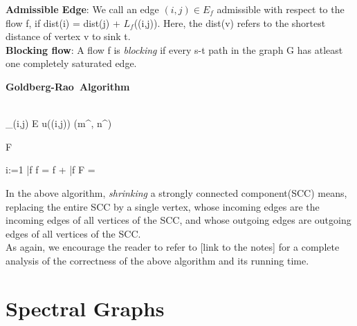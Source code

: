 \documentclass[BTech]{iitmdiss}
\begin{document}
	    
	    \textbf{Admissible Edge}: We call an edge $(i, j) \in E_f$ admissible with respect to the flow f, if dist(i) = dist(j) + $L_f$((i,j)). Here,
	    the dist(v) refers to the shortest distance of vertex v to sink t. \\
	    
	    \textbf{Blocking flow}: A flow f is \textit{blocking} if every s-t path in the graph G has atleast one completely saturated edge. \\
	    
	    \begin{program}
	      \mbox{\textbf{Goldberg-Rao Algorithm}}
	      
	      \BEGIN \\ %
		 \displaystyle\max_{(i,j) \in E} u((i,j))
		 \varLambda {} \min(m^{}, n^{})
		
		\WHILE F  \DO
		   \Delta {} 
		  
		  \FOR i:=1  \ast \varLambda \DO
		     
		     \bar{f}  
		    \text{ - }f = f + \bar{f}
		  \OD
		  F = 
		\OD
	      \END
	    \end{program}
	    
	    In the above algorithm, \textit{shrinking} a strongly connected component(SCC) means, replacing the entire SCC by a 
	    single vertex, whose incoming edges are the incoming edges of all vertices of the SCC, and whose outgoing edges
	    are outgoing edges of all vertices of the SCC. \\
	    
	    As again, we encourage the reader to refer to [link to the notes] for a complete analysis of the correctness of the above algorithm
	    and its running time.
	 \chapter{Spectral Graphs}
	 
\end{document}
